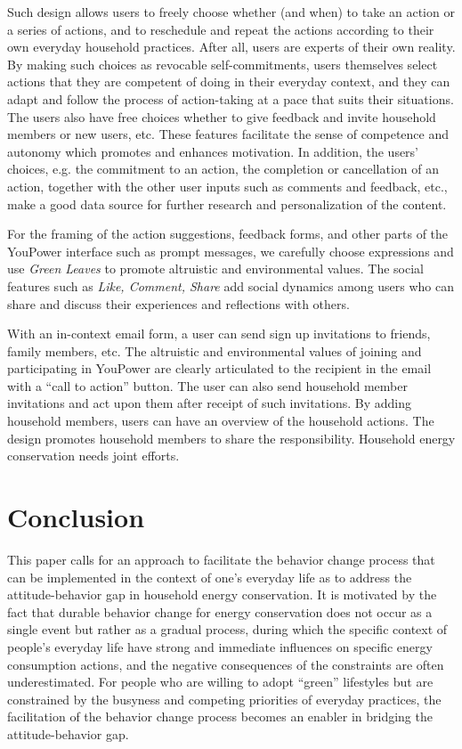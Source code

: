 \documentclass[a4paper,10pt]{article}
\begin{document}
Such design allows users to freely choose whether (and when) to take an action or a series of actions, and to reschedule and repeat the actions according to their own everyday household practices. After all, users are experts of their own reality. By making such choices as revocable self-commitments, users themselves select actions that they are competent of doing in their everyday context, and they can adapt and follow the process of action-taking at a pace that suits their situations. The users also have free choices whether to give feedback and invite household members or new users, etc. These features facilitate the sense of competence and autonomy which promotes and enhances motivation. In addition, the users' choices, e.g. the commitment to an action, the completion or cancellation of an action, together with the other user inputs such as comments and feedback, etc., make a good data source for further research and personalization of the content. 

For the framing of the action suggestions, feedback forms, and other parts of the YouPower interface such as prompt messages, we carefully choose expressions and use \textit{Green Leaves} to promote altruistic and environmental values. The social features such as \textit{Like, Comment, Share} add social dynamics among users who can share and discuss their experiences and reflections with others. 

With an in-context email form, a user can send sign up invitations to friends, family members, etc. The altruistic and environmental values of joining and participating in YouPower are clearly articulated to the recipient in the email with a ``call to action'' \citep{Crumlish2009} button. The user can also send household member invitations and act upon them after receipt of such invitations. By adding household members, users can have an overview of the household actions. The design promotes household members to share the responsibility. Household energy conservation needs joint efforts. 

\section{Conclusion}
\label{sec:conclusion}

This paper calls for an approach to facilitate the behavior change process that can be implemented in the context of one's everyday life as to address the attitude-behavior gap in household energy conservation. It is motivated by the fact that durable behavior change for energy conservation does not occur as a single event but rather as a gradual process, during which the specific context of people's everyday life have strong and immediate influences on specific energy consumption actions, and the negative consequences of the constraints are often underestimated. For people who are willing to adopt ``green'' lifestyles but are constrained by the busyness and competing priorities of everyday practices, the facilitation of the behavior change process becomes an enabler in bridging the attitude-behavior gap. 
\end{document}
